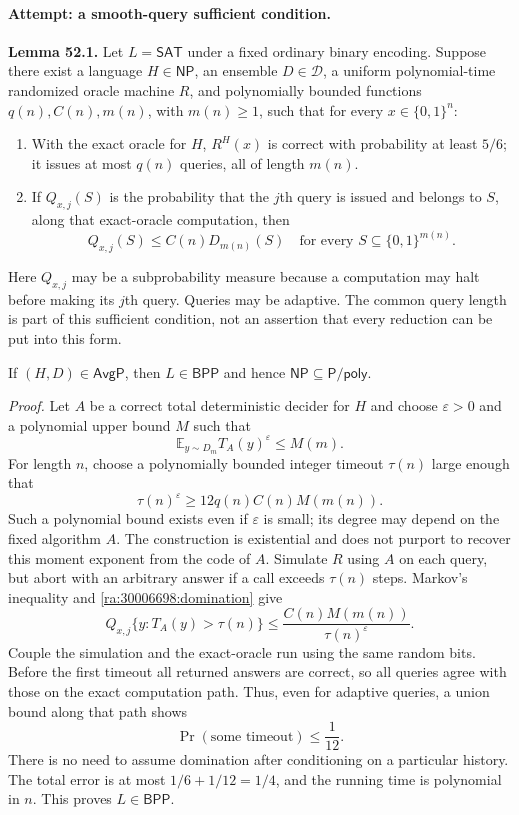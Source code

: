 \documentclass[11pt]{article}
\newcommand{\E}{\mathbb{E}}
\begin{document}
\paragraph{Attempt: a smooth-query sufficient condition.}
\textbf{Lemma 52.1.} Let $L=\mathsf{SAT}$ under a fixed ordinary binary
encoding. Suppose there exist a language $H\in\mathsf{NP}$, an ensemble
$D\in\mathcal D$, a uniform polynomial-time randomized oracle machine $R$,
and polynomially bounded functions $q(n),C(n),m(n)$, with $m(n)\ge1$, such
that for every $x\in\{0,1\}^n$:

\begin{enumerate}[label=(\roman*),leftmargin=2.5em]
\item With the exact oracle for $H$, $R^H(x)$ is correct with probability
at least $5/6$; it issues at most $q(n)$ queries, all of length $m(n)$.
\item If $Q_{x,j}(S)$ is the probability that the $j$th query is issued
and belongs to $S$, along that exact-oracle computation, then
\begin{equation}\label{ra:30006698:domination}
 Q_{x,j}(S)\le C(n)D_{m(n)}(S)
 \quad\text{for every }S\subseteq\{0,1\}^{m(n)}.
\end{equation}
\end{enumerate}
Here $Q_{x,j}$ may be a subprobability measure because a computation may
halt before making its $j$th query. Queries may be adaptive. The common
query length is part of this sufficient condition, not an assertion that
every reduction can be put into this form.

If $(H,D)\in\mathsf{AvgP}$, then $L\in\mathsf{BPP}$ and hence
$\mathsf{NP}\subseteq\mathsf{P/poly}$.

\textit{Proof.} Let $A$ be a correct total deterministic decider for $H$
and choose $\varepsilon>0$ and a polynomial upper bound $M$ such that
\[
 \E_{y\sim D_m}T_A(y)^\varepsilon\le M(m).
\]
For length $n$, choose a polynomially bounded integer timeout $\tau(n)$
large enough that
\begin{equation}\label{ra:30006698:timeout}
 \tau(n)^\varepsilon\ge
 12q(n)C(n)M(m(n)).
\end{equation}
Such a polynomial bound exists even if $\varepsilon$ is small; its degree
may depend on the fixed algorithm $A$. The construction is existential
and does not purport to recover this moment exponent from the code of $A$.
Simulate $R$ using $A$ on each query, but abort with an arbitrary answer
if a call exceeds $\tau(n)$ steps. Markov's inequality and
\eqref{ra:30006698:domination} give
\[
 Q_{x,j}\{y:T_A(y)>\tau(n)\}
 \le\frac{C(n)M(m(n))}{\tau(n)^\varepsilon}.
\]
Couple the simulation and the exact-oracle run using the same random
bits. Before the first timeout all returned answers are correct, so all
queries agree with those on the exact computation path. Thus, even for
adaptive queries, a union bound along that path shows
\[
 \Pr(\text{some timeout})\le\frac1{12}.
\]
There is no need to assume domination after conditioning on a particular
history. The total error is at most $1/6+1/12=1/4$, and the running time
is polynomial in $n$. This proves $L\in\mathsf{BPP}$.
\end{document}
